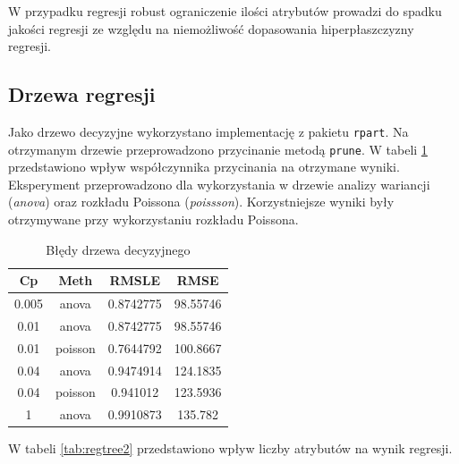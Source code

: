 \documentclass[a4paper,12pt]{article}
\begin{document}
    W przypadku regresji robust ograniczenie ilości atrybutów prowadzi do spadku jakości regresji ze względu na niemożliwość dopasowania hiperpłaszczyzny regresji.
    
   \subsection{Drzewa regresji}
       Jako drzewo decyzyjne wykorzystano implementację z pakietu \texttt{rpart}. Na otrzymanym drzewie przeprowadzono przycinanie metodą \texttt{prune}.
       W tabeli \ref{tab:regtree1} przedstawiono wpływ współczynnika przycinania na otrzymane wyniki. Eksperyment przeprowadzono dla wykorzystania w drzewie analizy wariancji (\textit{anova}) oraz rozkładu Poissona (\textit{poissson}). Korzystniejsze wyniki były otrzymywane przy wykorzystaniu rozkładu Poissona.
        \begin{table}
        	\centering
            \begin{tabular}{|c|c|c|c|}
                \hline
                Cp & Meth & RMSLE & RMSE \\
                \hline
                0.005 & anova & 0.8742775 & 98.55746 \\
                \hline
                0.01 & anova & 0.8742775 & 98.55746 \\
                \hline
                0.01 & poisson & 0.7644792 & 100.8667 \\
                \hline
                0.04 & anova & 0.9474914 & 124.1835 \\
                \hline
                0.04 & poisson & 0.941012 & 123.5936 \\
                \hline
                1 & anova & 0.9910873 & 135.782 \\
                \hline
            \end{tabular}
            \caption{Błędy drzewa decyzyjnego}
            \label{tab:regtree1}
        \end{table}
        
        W tabeli \ref{tab:regtree2} przedstawiono wpływ liczby atrybutów na wynik regresji.
        
\end{document}
